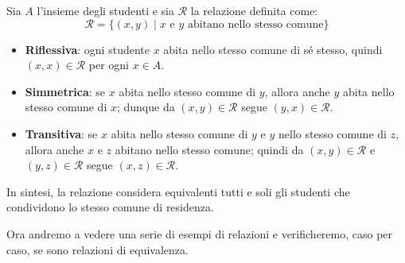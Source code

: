 \begin{esempio}
Sia \(A\) l'insieme degli studenti e sia \(\mathcal{R}\) la relazione definita come:
\[
\mathcal{R} = \{(x, y) \mid x \text{ e } y \text{ abitano nello stesso comune}\}
\]




\begin{itemize}
 \item \textbf{Riflessiva}: ogni studente \(x\) abita nello stesso comune di sé stesso, quindi
       \((x,x)\in\mathcal{R}\) per ogni \(x\in A\).
 \item \textbf{Simmetrica}: se \(x\) abita nello stesso comune di \(y\), allora anche \(y\) abita
       nello stesso comune di \(x\); dunque da \((x,y)\in\mathcal{R}\) segue \((y,x)\in\mathcal{R}\).
 \item \textbf{Transitiva}: se \(x\) abita nello stesso comune di \(y\) e \(y\) nello stesso comune
       di \(z\), allora anche \(x\) e \(z\) abitano nello stesso comune; quindi da
       \((x,y)\in\mathcal{R}\) e \((y,z)\in\mathcal{R}\) segue \((x,z)\in\mathcal{R}\).
\end{itemize}
In sintesi, la relazione  considera equivalenti tutti e soli gli studenti che condividono lo stesso comune di residenza.


\end{esempio}





Ora andremo a vedere una serie di esempi di relazioni e verificheremo,
caso per caso, se sono relazioni di equivalenza. 

